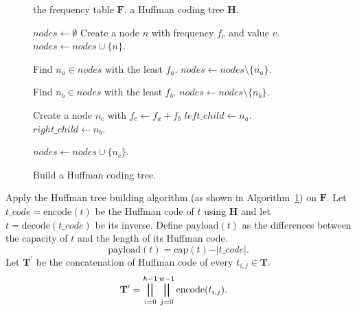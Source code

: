 \documentclass{elsarticle}
\begin{document}
	\begin{figure}[!t]
		\begin{algorithm}[H]
			\caption{Build a Huffman coding tree.}
			\label{algo:buildtree}
			
			\begin{algorithmic}[1]
				\Require the frequency table \(\mathbf{F}\).
				\Ensure a Huffman coding tree \(\mathbf{H}\).
				
				\State \(nodes \gets \emptyset\)
				\State Create a node \(n\) with frequency \(f_v\) and value \(v\).
				\State \(nodes \gets nodes \cup \{n\}\).
				\EndFor
				
				\State Find \(n_a \in nodes\) with the least \(f_a\).
				\State \(nodes \gets nodes \setminus \{n_a\}\).
				
				\State Find \(n_b \in nodes\) with the least \(f_b\).
				\State \(nodes \gets nodes \setminus \{n_b\}\).
				
				\State Create a node \(n_c\) with 
				\State\hspace{\algorithmicindent} \(f_c \leftarrow f_a + f_b\)
				\State\hspace{\algorithmicindent} \(left\_child \leftarrow n_a\).
				\State\hspace{\algorithmicindent} \(right\_child \leftarrow n_b\).
				
				\State \(nodes \gets nodes \cup \{n_c\}\).
				\EndWhile
			\end{algorithmic}
		\end{algorithm}
	\end{figure}
	
	Apply the Huffman tree building algorithm (as shown in Algorithm~\ref{algo:buildtree}) on \(\mathbf{F}\).
	Let \(t\_code = \mathrm{encode}(t)\) be the Huffman code of \(t\) using \(\mathbf{H}\) and let \(t = \mathrm{decode}(t\_code)\) be its inverse. 
	Define \(\mathrm{payload}(t)\) as the differences between the capacity of $t$ and the length of its Huffman code. 
	\begin{equation}
		\label{eq:payload}
		\mathrm{payload}(t) = \mathrm{cap}(t) - \vert t\_code \vert .
	\end{equation}
	Let \(\mathbf{T^\prime}\) be the concatenation of Huffman code of every \(t_{i, j} \in \mathbf{T}\).
	\begin{align}
		\label{eq:encodeT1}
		\mathbf{T^\prime} &= \bigparallel_{i = 0}^{h - 1}  { \bigparallel_{j = 0}^{w - 1} \mathrm{encode}(t_{i, j})}. %
	\end{align}
	
\end{document}
